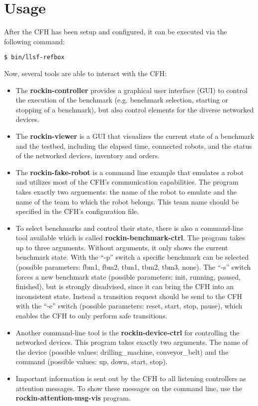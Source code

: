 \documentclass{article}
\begin{document}
\section{Usage}
After the CFH has been setup and configured, it can be executed via the following command:
\begin{lstlisting}
$ bin/llsf-refbox
\end{lstlisting}
Now, several tools are able to interact with the CFH:
\begin{itemize}
  \item The \textbf{rockin-controller} provides a graphical user interface (GUI) to control the execution of the
    benchmark (e.g. benchmark selection, starting or stopping of a benchmark), but also control elements for the diverse
    networked devices.
  \item The \textbf{rockin-viewer} is a GUI that visualizes the current state of a benchmark and the testbed, including
    the elapsed time, connected robots, and the status of the networked devices, inventory and orders.
  \item The \textbf{rockin-fake-robot} is a command line example that emulates a robot and utilizes most of the CFH's
    communication capabilities. The program takes exactly two arguements: the name of the robot to emulate and the name
    of the team to which the robot belongs. This team name should be specified in the CFH's configuration file.
  \item To select benchmarks and control their state, there is also a command-line tool available which is called
    \textbf{rockin-benchmark-ctrl}. The program takes up to three arguments. Without arguments, it only shows the
    current benchmark state. With the ``-p'' switch a specific benchmark can be selected (possible parameters: fbm1,
    fbm2, tbm1, tbm2, tbm3, none). The ``-s'' switch forces a new benchmark state (possible parameters: init, running,
    paused, finished), but is strongly disadvised, since it can bring the CFH into an inconsistent state. Instead a
    transition request should be send to the CFH with the ``-e'' switch (possible parameters: reset, start, stop,
    pause), which enables the CFH to only perform safe transitions.
  \item Another command-line tool is the \textbf{rockin-device-ctrl} for controlling the networked devices. This program
    takes exactly two arguments. The name of the device (possible values: drilling\_machine, conveyor\_belt) and the
    command (possible values: up, down, start, stop).
  \item Important information is sent out by the CFH to all listening controllers as attention messages. To show these
    messages on the command line, use the \textbf{rockin-attention-msg-vis} program.
\end{itemize}
\end{document}
